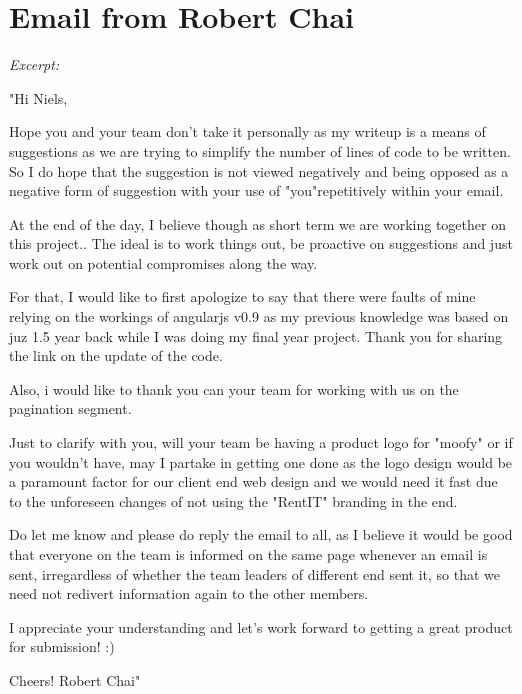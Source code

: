 \section{Email from Robert Chai}
\label{app:robertsletter}
\emph{Excerpt:}

"Hi Niels,

Hope you and your team don't take it personally as my writeup is a means of
suggestions as we are trying to simplify the number of lines of code to be
written. So I do hope that the suggestion is not viewed negatively and being
opposed as a negative form of suggestion with your use of "you"repetitively
within your email.

At the end of the day, I believe though as short term we are working together
on this project.. The ideal is to work things out, be proactive on suggestions
and just work out on potential compromises along the way.

For that, I would like to first apologize to say that there were faults of mine
relying on the workings of angularjs v0.9 as my previous knowledge was based on
juz 1.5 year back while I was doing my final year project. Thank you for
sharing the link on the update of the code.

Also, i would like to thank you can your team for working with us on the
pagination segment.

Just to clarify with you, will your team be having a product logo for "moofy" or if you wouldn't have, may I partake in getting one done as the logo design would be a paramount factor for our client end web design and we would need it fast due to the unforeseen changes of not using the "RentIT" branding in the end.

Do let me know and please do reply the email to all, as I believe it would be good that everyone on the team is informed on the same page whenever an email is sent, irregardless of whether the team leaders of different end sent it, so that we need not redivert information again to the other members.

I appreciate your understanding and let's work forward to getting a great product for submission! :)

Cheers! 
Robert Chai"